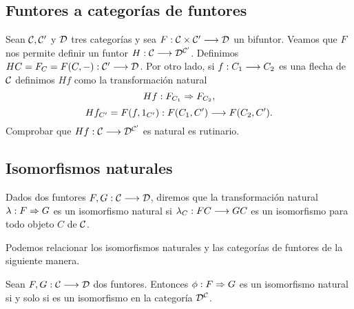 \subsection{Funtores a categorías de funtores}
Sean $\mathcal{C}, \mathcal{C}'$ y $\mathcal{D}$ tres categorías y sea
$F: \mathcal{C}\times \mathcal{C}'\longrightarrow \mathcal{D}$ un bifuntor. Veamos que
$F$ nos permite definir
un funtor
$H: \mathcal{C}\longrightarrow \mathcal{D}^{\mathcal{C}'}$. Definimos
$HC = F_C = F(C, -) : \mathcal{C}'\longrightarrow \mathcal{D}$. Por otro lado,
si $f: C_1\longrightarrow C_2$ es una flecha de $\mathcal{C}$ definimos
$Hf$ como la transformación natural
$$Hf: F_{C_1}\Rightarrow F_{C_2},$$
$$Hf_{C'} = F(f, 1_{C'}): F(C_1, C')\longrightarrow F(C_2, C').$$
Comprobar que $Hf: \mathcal{C}\longrightarrow \mathcal{D}^{\mathcal{C}'}$ es natural
es rutinario.

\subsection{Isomorfismos naturales}
\begin{definition}
  Dados dos funtores $F, G : \mathcal{C}\longrightarrow \mathcal{D}$, diremos que la transformación
  natural $\lambda : F\Rightarrow G$ es un isomorfismo natural si
  $\lambda_C : FC\longrightarrow GC$ es un isomorfismo para todo objeto $C$
  de $\mathcal{C}$.
\end{definition}
Podemos relacionar los isomorfismos naturales y las categorías
de funtores de la siguiente manera.
\begin{proposition}
  Sean $F, G : \mathcal{C}\longrightarrow \mathcal{D}$ dos funtores. Entonces
  $\phi: F\Rightarrow G$
  es un isomorfismo natural si y solo si es un isomorfismo
  en la categoría $\mathcal{D}^{\mathcal{C}}$.
\end{proposition}
